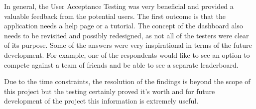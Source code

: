 In general, the User Acceptance Testing was very beneficial and provided a valuable feedback from the potential users. The first outcome is that the application needs a help page or a tutorial. The concept of the dashboard also needs to be revisited and possibly redesigned, as not all of the testers were clear of its purpose. Some of the answers were very inspirational in terms of the future development. For example, one of the respondents would like to see an option to compete against a team of friends and be able to see a separate leaderboard.

Due to the time constraints, the resolution of the findings is beyond the scope of this project but the testing certainly proved it's worth and for future development of the project this information is extremely useful.
